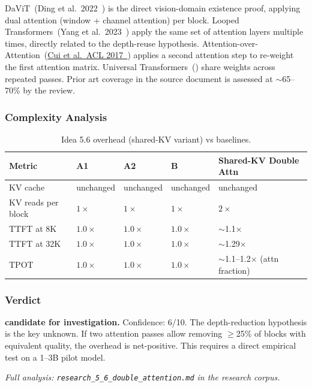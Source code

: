 \documentclass[11pt]{article}
\begin{document}
DaViT~(Ding et al.\ 2022~\cite{DingDaViT2022}) is the direct vision-domain existence proof, applying dual attention (window + channel attention) per block. Looped Transformers~(Yang et al.\ 2023~\cite{YangLooped2023}) apply the same set of attention layers multiple times, directly related to the depth-reuse hypothesis. Attention-over-Attention~(\href{https://aclanthology.org/P17-1184}{Cui et al.\ ACL 2017~\cite{CuiAoA2017}}) applies a second attention step to re-weight the first attention matrix. Universal Transformers~(\cite{DehghaniUniversalTransformer2018}) share weights across repeated passes. Prior art coverage in the source document is assessed at $\sim$65--70\% by the review.

\subsubsection*{Complexity Analysis}

\begin{table}[h]
\centering
\caption{Idea 5.6 overhead (shared-KV variant) vs baselines.}
\small
\begin{tabular}{lllll}
\toprule
Metric & A1 & A2 & B & Shared-KV Double Attn \\
\midrule
KV cache & unchanged & unchanged & unchanged & unchanged \\
KV reads per block & $1\times$ & $1\times$ & $1\times$ & $2\times$ \\
TTFT at 8K & $1.0\times$ & $1.0\times$ & $1.0\times$ & $\sim$1.1$\times$ \\
TTFT at 32K & $1.0\times$ & $1.0\times$ & $1.0\times$ & $\sim$1.29$\times$ \\
TPOT & $1.0\times$ & $1.0\times$ & $1.0\times$ & $\sim$1.1--1.2$\times$ (attn fraction) \\
\bottomrule
\end{tabular}
\end{table}

\subsubsection*{Verdict}

\noindent\textbf{candidate for investigation.} Confidence: 6/10. The depth-reduction hypothesis is the key unknown. If two attention passes allow removing $\geq$25\% of blocks with equivalent quality, the overhead is net-positive. This requires a direct empirical test on a 1--3B pilot model.

\par\noindent\textit{Full analysis: \texttt{research\_5\_6\_double\_attention.md} in the research corpus.}
\end{document}
